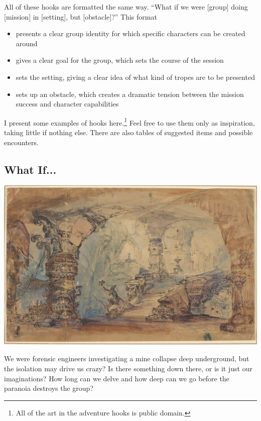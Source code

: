 \documentclass[landscape]{book}
\begin{document}
\begin{multicols*}{4}
All of these hooks are formatted the same way.
``What if we were [group] doing [mission] in [setting], but [obstacle]?''
This format

\begin{itemize}
\item presents a clear group identity for which specific characters can be created around
\item gives a clear goal for the group, which sets the course of the session
\item sets the setting, giving a clear idea of what kind of tropes are to be presented
\item sets up an obstacle, which creates a dramatic tension between the mission success and character capabilities
\end{itemize}

I present some examples of hooks here.\footnote{All of the art in the adventure hooks is public domain.}
Feel free to use them only as inspiration, taking little if nothing else.
There are also tables of suggested items and possible encounters.

\subsection*{What If...}

\includegraphics[width=\columnwidth]{./fantastic_cave}

We were forensic engineers investigating a mine collapse deep underground, but the isolation may drive us crazy?
Is there something down there, or is it just our imaginations?
How long can we delve and how deep can we go before the paranoia destroys the group? \\


\end{multicols*}
\end{document}
